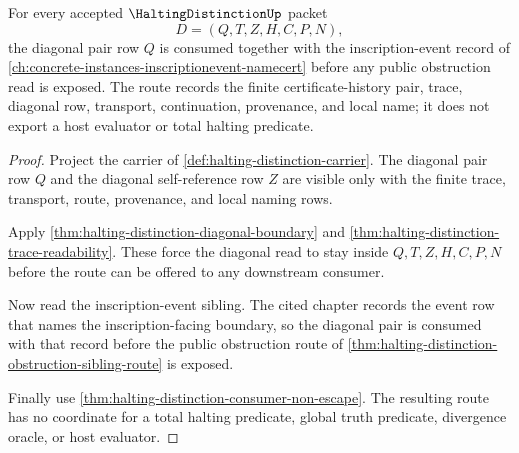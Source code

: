 \begin{theorem}
\label{thm:halting-distinction-inscription-event-route}
For every accepted $\HaltingDistinctionUp$ packet
$$
D=(Q,T,Z,H,C,P,N),
$$
the diagonal pair row $Q$ is consumed together with the inscription-event record of \autoref{ch:concrete-instances-inscriptionevent-namecert} before any public obstruction read is exposed. The route records the finite certificate-history pair, trace, diagonal row, transport, continuation, provenance, and local name; it does not export a host evaluator or total halting predicate.
\end{theorem}
\begin{proof}
Project the carrier of \autoref{def:halting-distinction-carrier}. The diagonal pair row $Q$ and the diagonal self-reference row $Z$ are visible only with the finite trace, transport, route, provenance, and local naming rows.

Apply \autoref{thm:halting-distinction-diagonal-boundary} and \autoref{thm:halting-distinction-trace-readability}. These force the diagonal read to stay inside $Q,T,Z,H,C,P,N$ before the route can be offered to any downstream consumer.

Now read the inscription-event sibling. The cited chapter records the event row that names the inscription-facing boundary, so the diagonal pair is consumed with that record before the public obstruction route of \autoref{thm:halting-distinction-obstruction-sibling-route} is exposed.

Finally use \autoref{thm:halting-distinction-consumer-non-escape}. The resulting route has no coordinate for a total halting predicate, global truth predicate, divergence oracle, or host evaluator.
\end{proof}

